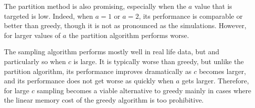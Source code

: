 The partition method is also promising, especially when the $a$ value
that is targeted is low. Indeed, when $a=1$ or $a=2$, its performance
is comparable or better than greedy, though it is not as pronounced as
the simulations. However, for larger values of $a$ the partition
algorithm performs worse. 

The sampling algorithm performs mostly well in real life data, but and
particularly so when $c$ is large. It is typically worse than
greedy, but unlike the partition algorithm, its performance improves
dramatically as $c$ becomes larger, and its performance does not get
worse as quickly when $a$ gets larger. Therefore, for large $c$ 
sampling becomes a viable alternative to greedy mainly in cases where the
linear memory cost of the greedy algorithm is too prohibitive. 
